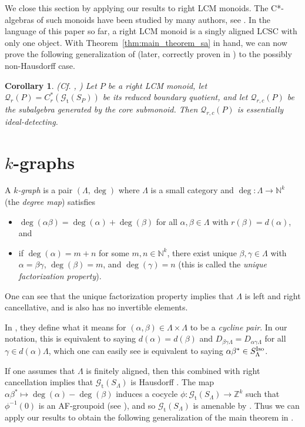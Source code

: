 \documentclass[12pt]{amsart}
\newtheorem{cor}[thm]{Corollary}
\theoremstyle{definition}
\theoremstyle{remark}
\numberwithin{equation}{section}
\newcommand{\NN}{\mathbb{N}}
\newcommand{\ZZ}{\mathbb{Z}}
\newcommand{\Q}{\mathcal{Q}}
\renewcommand{\L}{\Lambda}
\renewcommand{\a}{\alpha}
\renewcommand{\b}{\beta}
\newcommand{\gt}{\mathcal{G}_{\text{t}}}
\newcommand{\Iso}{\textup{Iso}}
\newcommand{\ga}{\gamma}
\begin{document}
We close this section by applying our results to right LCM monoids. The C*-algebras of such monoids have been studied by many authors, see \cite{ABLS19, BOS18, BLS16, BLS18, BS16, LL20, LaLi22, LiB19, NS22, Stam15, Stam17, StLCM}. In the language of this paper so far, a right LCM monoid is a singly aligned LCSC with only one object. With Theorem~\ref{thm:main_theorem_sa} in hand, we can now prove the following generalization of \cite[Theorem~4.1]{St22} (later, correctly proven in \cite{BS24}) to the possibly non-Hausdorff case.

\begin{cor}\label{cor:LCM} (Cf. \cite[Theorem~4.1]{St22}, \cite[Theorem~2.1]{BS24})
	Let $P$ be a right LCM monoid, let $\Q_r(P) = C^*_r(\gt(S_P))$ be its reduced boundary quotient, and let $\Q_{r,c}(P)$ be the subalgebra generated by the core submonoid. Then $\Q_{r,c}(P)$ is essentially ideal-detecting.
\end{cor}

	\section{$k$-graphs}
	
	A {\em $k$-graph} is a pair $(\L, \deg)$ where $\L$ is a small category and  $\deg:\L\to \NN^k$ (the {\em degree map}) satisfies
	\begin{itemize}
		\item $\deg(\a\b) = \deg(\a) + \deg(\b)$ for all $\a,\b\in\L$ with $r(\b) = d(\a)$, and
		\item if $\deg(\a) = m+n$ for some $m,n\in \NN^k$, there exist unique $\b,\ga\in \L$ with $\a = \b\ga$, $\deg(\b) = m$, and $\deg(\ga) = n$ (this is called the {\em unique factorization property}). 
	\end{itemize} 
	One can see that the unique factorization property implies that $\L$ is left and right cancellative, and is also has no invertible elements. 

	
	In \cite{BNR14}, they define what it means for  $(\a,\b)\in\L\times\L$ to be a {\em cycline pair}. In our notation, this is equivalent to saying $d(\a) = d(\b)$ and $D_{\b\ga\L}= D_{\a\ga\L}$ for all $\ga\in d(\a)\L$, which one can easily see is equivalent to saying $\a\b^*\in S^\Iso_\L$.
	
	If one assumes that $\L$ is finitely aligned, then this combined with right cancellation implies that $\gt(S_\L)$ is Hausdorff \cite[Lemma~7.1]{Sp20}. The map $\a\b^*\mapsto \deg(\a)-\deg(\b)$ induces a cocycle $\phi:\gt(S_\L)\to\ZZ^k$ such that $\phi^{-1}(0)$ is an AF-groupoid (see \cite[Section~3]{RSY04}), and so $\gt(S_\L)$ is amenable by \cite[Corollary~4.5]{RW17}. Thus we can apply our results to obtain the following generalization of the main theorem in \cite[Theorem~7.1]{BNR14}.
	
\end{document}
